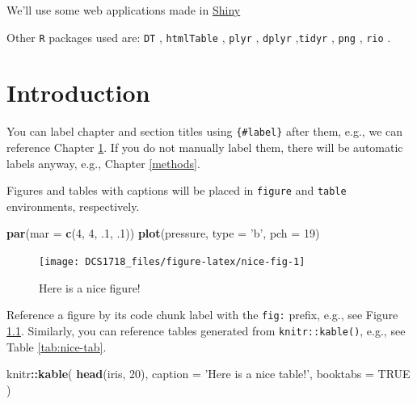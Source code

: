 \documentclass[12pt,]{book}
\newenvironment{Shaded}{\begin{snugshade}}{\end{snugshade}}
\newcommand{\KeywordTok}[1]{\textcolor[rgb]{0.13,0.29,0.53}{\textbf{#1}}}
\newcommand{\DataTypeTok}[1]{\textcolor[rgb]{0.13,0.29,0.53}{#1}}
\newcommand{\DecValTok}[1]{\textcolor[rgb]{0.00,0.00,0.81}{#1}}
\newcommand{\StringTok}[1]{\textcolor[rgb]{0.31,0.60,0.02}{#1}}
\newcommand{\OtherTok}[1]{\textcolor[rgb]{0.56,0.35,0.01}{#1}}
\newcommand{\OperatorTok}[1]{\textcolor[rgb]{0.81,0.36,0.00}{\textbf{#1}}}
\newcommand{\NormalTok}[1]{#1}
\theoremstyle{definition}
\theoremstyle{definition}
\theoremstyle{definition}
\theoremstyle{remark}
\begin{document}
We'll use some web applications made in
\href{http://shiny.rstudio.com}{Shiny} \citep{R-shiny}

Other \texttt{R} packages used are: \texttt{DT} \citep{R-DT},
\texttt{htmlTable} \citep{R-htmlTable}, \texttt{plyr} \citep{R-plyr},
\texttt{dplyr} \citep{R-dplyr},\texttt{tidyr} \citep{R-tidyr},
\texttt{png} \citep{R-png}, \texttt{rio} \citep{R-rio}.

\chapter{Introduction}\label{intro}

You can label chapter and section titles using \texttt{\{\#label\}}
after them, e.g., we can reference Chapter \ref{intro}. If you do not
manually label them, there will be automatic labels anyway, e.g.,
Chapter \ref{methods}.

Figures and tables with captions will be placed in \texttt{figure} and
\texttt{table} environments, respectively.

\begin{Shaded}
\begin{Highlighting}[]
\KeywordTok{par}\NormalTok{(}\DataTypeTok{mar =} \KeywordTok{c}\NormalTok{(}\DecValTok{4}\NormalTok{, }\DecValTok{4}\NormalTok{, .}\DecValTok{1}\NormalTok{, .}\DecValTok{1}\NormalTok{))}
\KeywordTok{plot}\NormalTok{(pressure, }\DataTypeTok{type =} \StringTok{'b'}\NormalTok{, }\DataTypeTok{pch =} \DecValTok{19}\NormalTok{)}
\end{Highlighting}
\end{Shaded}

\begin{figure}

{\centering \texttt{[image: DCS1718\_files/figure-latex/nice-fig-1]} 

}

\caption{Here is a nice figure!}\label{fig:nice-fig}
\end{figure}

Reference a figure by its code chunk label with the \texttt{fig:}
prefix, e.g., see Figure \ref{fig:nice-fig}. Similarly, you can
reference tables generated from \texttt{knitr::kable()}, e.g., see Table
\ref{tab:nice-tab}.

\begin{Shaded}
\begin{Highlighting}[]
\NormalTok{knitr}\OperatorTok{::}\KeywordTok{kable}\NormalTok{(}
  \KeywordTok{head}\NormalTok{(iris, }\DecValTok{20}\NormalTok{), }\DataTypeTok{caption =} \StringTok{'Here is a nice table!'}\NormalTok{,}
  \DataTypeTok{booktabs =} \OtherTok{TRUE}
\NormalTok{)}
\end{Highlighting}
\end{Shaded}
\end{document}
